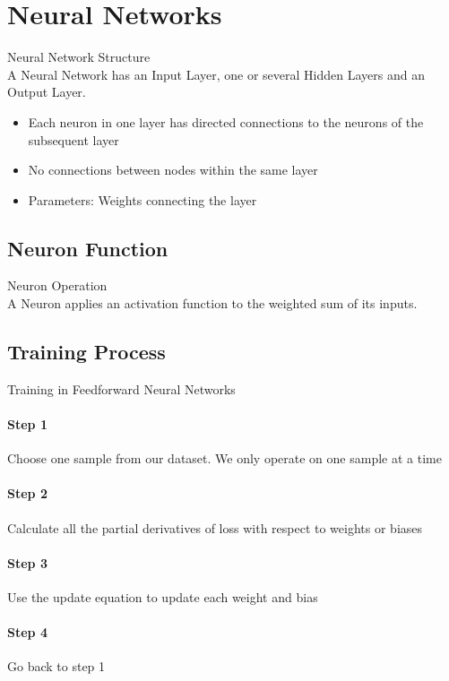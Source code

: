 \section{Neural Networks}

\begin{definition}{Neural Network Structure}\\
A Neural Network has an Input Layer, one or several Hidden Layers and an Output Layer.
\begin{itemize}
    \item Each neuron in one layer has directed connections to the neurons of the subsequent layer
    \item No connections between nodes within the same layer
    \item Parameters: Weights connecting the layer
\end{itemize}
\end{definition}


\subsection{Neuron Function}

\begin{definition}{Neuron Operation}\\
A Neuron applies an activation function to the weighted sum of its inputs.
\end{definition}


\subsection{Training Process}

\begin{KR}{Training in Feedforward Neural Networks}\\
\paragraph{Step 1}
Choose one sample from our dataset. We only operate on one sample at a time

\paragraph{Step 2}
Calculate all the partial derivatives of loss with respect to weights or biases

\paragraph{Step 3}
Use the update equation to update each weight and bias

\paragraph{Step 4}
Go back to step 1
\end{KR}

